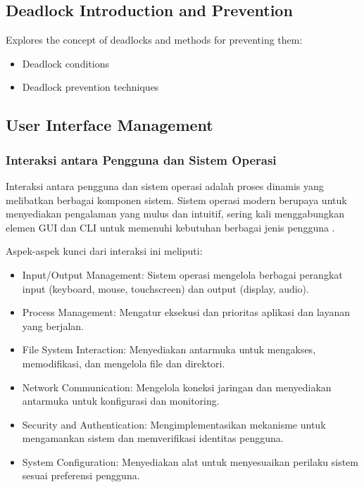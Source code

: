 \documentclass[12pt]{article}
\begin{document}
\subsection{Deadlock Introduction and Prevention}
Explores the concept of deadlocks and methods for preventing them:
\begin{itemize}
    \item Deadlock conditions
    \item Deadlock prevention techniques
\end{itemize}

\subsection{User Interface Management}
\subsubsection{Interaksi antara Pengguna dan Sistem Operasi}
		
		Interaksi antara pengguna dan sistem operasi adalah proses dinamis yang melibatkan berbagai komponen sistem. Sistem operasi modern berupaya untuk menyediakan pengalaman yang mulus dan intuitif, sering kali menggabungkan elemen GUI dan CLI untuk memenuhi kebutuhan berbagai jenis pengguna \cite{Tanenbaum2015}.
		
		Aspek-aspek kunci dari interaksi ini meliputi:
		\begin{itemize}
			\item Input/Output Management: Sistem operasi mengelola berbagai perangkat input (keyboard, mouse, touchscreen) dan output (display, audio).
			\item Process Management: Mengatur eksekusi dan prioritas aplikasi dan layanan yang berjalan.
			\item File System Interaction: Menyediakan antarmuka untuk mengakses, memodifikasi, dan mengelola file dan direktori.
			\item Network Communication: Mengelola koneksi jaringan dan menyediakan antarmuka untuk konfigurasi dan monitoring.
			\item Security and Authentication: Mengimplementasikan mekanisme untuk mengamankan sistem dan memverifikasi identitas pengguna.
			\item System Configuration: Menyediakan alat untuk menyesuaikan perilaku sistem sesuai preferensi pengguna.
		\end{itemize}
		
\end{document}

